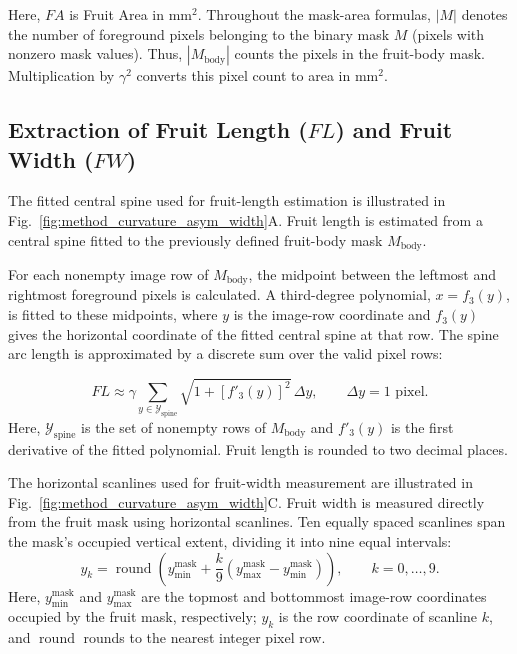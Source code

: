 \documentclass[final,5p,times,twocolumn]{elsarticle}
\begin{document}
Here, $FA$ is Fruit Area in mm$^2$. Throughout the mask-area formulas, $|M|$ denotes the number of foreground pixels belonging to the binary mask $M$ (pixels with nonzero mask values). Thus, $|M_{\mathrm{body}}|$ counts the pixels in the fruit-body mask. Multiplication by $\gamma^2$ converts this pixel count to area in mm$^2$.

\subsection*{Extraction of Fruit Length ($FL$) and Fruit Width ($FW$)}

The fitted central spine used for fruit-length estimation is illustrated in Fig.~\ref{fig:method_curvature_asym_width}A. Fruit length is estimated from a central spine fitted to the previously defined fruit-body mask $M_{\mathrm{body}}$.

For each nonempty image row of $M_{\mathrm{body}}$, the midpoint between the leftmost and rightmost foreground pixels is calculated. A third-degree polynomial, $x=f_3(y)$, is fitted to these midpoints, where $y$ is the image-row coordinate and $f_3(y)$ gives the horizontal coordinate of the fitted central spine at that row. The spine arc length is approximated by a discrete sum over the valid pixel rows:

\begin{equation}
 FL\approx\gamma\sum_{y\in\mathcal{Y}_{\mathrm{spine}}}\sqrt{1+\left[f'_3(y)\right]^2}\,\Delta y,\qquad\Delta y=1\text{ pixel}.
\end{equation}
Here, $\mathcal{Y}_{\mathrm{spine}}$ is the set of nonempty rows of $M_{\mathrm{body}}$ and $f'_3(y)$ is the first derivative of the fitted polynomial. Fruit length is rounded to two decimal places.

The horizontal scanlines used for fruit-width measurement are illustrated in Fig.~\ref{fig:method_curvature_asym_width}C. Fruit width is measured directly from the fruit mask using horizontal
scanlines. Ten equally spaced scanlines span the mask's occupied vertical
extent, dividing it into nine equal intervals:
\begin{equation}
    y_k = \operatorname{round}\left(
    y_{\min}^{\mathrm{mask}} +
    \frac{k}{9}\left(y_{\max}^{\mathrm{mask}}-y_{\min}^{\mathrm{mask}}\right)
    \right), \qquad k=0,\ldots,9.
\end{equation}
Here, $y_{\min}^{\mathrm{mask}}$ and $y_{\max}^{\mathrm{mask}}$ are the topmost and bottommost image-row coordinates occupied by the fruit mask, respectively; $y_k$ is the row coordinate of scanline $k$, and $\operatorname{round}$ rounds to the nearest integer pixel row.
\end{document}
